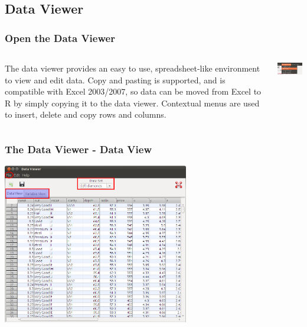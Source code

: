 \documentclass[xcolor={table}]{beamer}
\begin{document}
 \subsection{Data Viewer}
 \begin{frame}\frametitle{Open the Data Viewer}
   \begin{columns}
     \begin{column}{0.5\textwidth}
   The data viewer provides an easy to use, spreadsheet-like environment to view and edit data. Copy and pasting is supported, and is compatible with Excel 2003/2007, so data can be moved from Excel to R by simply copying it to the data viewer. Contextual menus are used to insert, delete and copy rows and columns.
 \end{column}
 \begin{column}{0.5\textwidth}
   \includegraphics[width=5cm]{dataviewer1.png}
 \end{column}
 \end{columns}
 \end{frame}

\begin{frame}\frametitle{The Data Viewer - Data View}
  \begin{center}
    \includegraphics[height=7cm]{dataviewer2.png}
  \end{center}
\end{frame}
\end{document}
